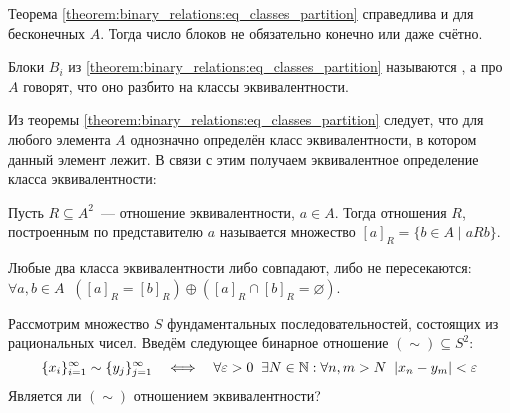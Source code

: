 \begin{remark}
    Теорема \ref{theorem:binary_relations:eq_classes_partition} справедлива и для бесконечных $ A $.
    Тогда число блоков не обязательно конечно или даже счётно.
\end{remark}

\begin{definition}
    Блоки $ B_i $ из \ref{theorem:binary_relations:eq_classes_partition} называются ,
    а про $ A $ говорят, что оно разбито на классы эквивалентности.
\end{definition}

Из теоремы \ref{theorem:binary_relations:eq_classes_partition} следует,
что для любого элемента $ A $ однозначно определён класс эквивалентности, в котором данный элемент лежит.
В связи с этим получаем эквивалентное определение класса эквивалентности:

\begin{definition}
    Пусть $ R \subseteq A^2 $~--- отношение эквивалентности, $ a \in A $.
    Тогда  отношения $ R $, построенным по представителю $ a $ называется множество
    $ [a]_R = \{ b \in A \mid a R b \} $.
\end{definition}

\begin{corollary}
    Любые два класса эквивалентности либо совпадают, либо не пересекаются:
    $ \forall a, b \in A \;\; ([a]_R = [b]_R) \oplus ([a]_R \cap [b]_R = \varnothing) $.
\end{corollary}

\begin{Exercise}[counter=SecExercise]
    \noindent
    Рассмотрим множество $ S $ фундаментальных последовательностей, состоящих из рациональных чисел.
    Введём следующее бинарное отношение $ (\sim) \subseteq S^2 $:
    \[
        \{x_i\}_{i = 1}^{\infty} \sim \{y_j\}_{j = 1}^{\infty}
        \quad \Longleftrightarrow \quad
        \forall \varepsilon > 0 \;\; \exists N \in \mathbb{N}: \forall n,m > N \;\; |x_n - y_m| < \varepsilon
    \]
    Является ли $ (\sim) $ отношением эквивалентности?
\end{Exercise}

